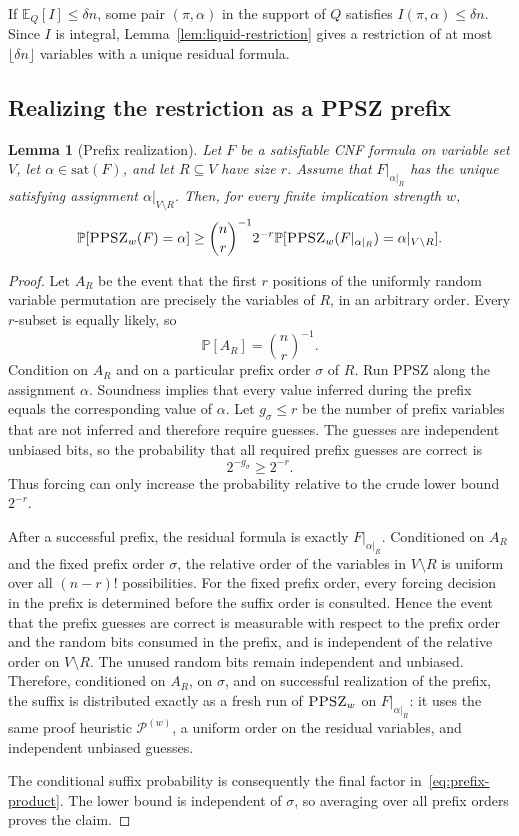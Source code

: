 \documentclass[11pt]{article}
\newtheorem{lemma}[theorem]{Lemma}
\newcommand{\PPSZ}{\textnormal{\textsc{PPSZ}}}
\newcommand{\Pw}{\mathcal P^{(w)}}
\newcommand{\sat}{\mathrm{sat}}
\newcommand{\E}{\mathbb E}
\newcommand{\Prb}{\mathbb P}
\begin{document}
If $\E_Q[I]\le\delta n$, some pair $(\pi,\alpha)$ in the support of $Q$ satisfies $I(\pi,\alpha)\le\delta n$.  Since $I$ is integral, Lemma~\ref{lem:liquid-restriction} gives a restriction of at most $\lfloor\delta n\rfloor$ variables with a unique residual formula.

\subsection{Realizing the restriction as a PPSZ prefix}

\begin{lemma}[Prefix realization]\label{lem:prefix-realization}
Let $F$ be a satisfiable CNF formula on variable set $V$, let $\alpha\in\sat(F)$, and let $R\subseteq V$ have size $r$.  Assume that
$F|_{\alpha|_R}$ has the unique satisfying assignment $\alpha|_{V\setminus R}$.  Then, for every finite implication strength $w$,
\begin{equation}\label{eq:prefix-product}
 \Prb[\PPSZ_w(F)=\alpha]
 \ge
 \binom nr^{-1}2^{-r}
 \Prb[\PPSZ_w(F|_{\alpha|_R})=\alpha|_{V\setminus R}].
\end{equation}
\end{lemma}

\begin{proof}
Let $A_R$ be the event that the first $r$ positions of the uniformly random variable permutation are precisely the variables of $R$, in an arbitrary order.  Every $r$-subset is equally likely, so
\[
 \Prb[A_R]=\binom nr^{-1}.
\]
Condition on $A_R$ and on a particular prefix order $\sigma$ of $R$.  Run PPSZ along the assignment $\alpha$.  Soundness implies that every value inferred during the prefix equals the corresponding value of $\alpha$.  Let $g_\sigma\le r$ be the number of prefix variables that are not inferred and therefore require guesses.  The guesses are independent unbiased bits, so the probability that all required prefix guesses are correct is
\[
 2^{-g_\sigma}\ge2^{-r}.
\]
Thus forcing can only increase the probability relative to the crude lower bound $2^{-r}$.

After a successful prefix, the residual formula is exactly $F|_{\alpha|_R}$.  Conditioned on $A_R$ and the fixed prefix order $\sigma$, the relative order of the variables in $V\setminus R$ is uniform over all $(n-r)!$ possibilities.  For the fixed prefix order, every forcing decision in the prefix is determined before the suffix order is consulted.  Hence the event that the prefix guesses are correct is measurable with respect to the prefix order and the random bits consumed in the prefix, and is independent of the relative order on $V\setminus R$.  The unused random bits remain independent and unbiased.  Therefore, conditioned on $A_R$, on $\sigma$, and on successful realization of the prefix, the suffix is distributed exactly as a fresh run of $\PPSZ_w$ on $F|_{\alpha|_R}$: it uses the same proof heuristic $\Pw$, a uniform order on the residual variables, and independent unbiased guesses.

The conditional suffix probability is consequently the final factor in~\eqref{eq:prefix-product}.  The lower bound is independent of $\sigma$, so averaging over all prefix orders proves the claim.
\end{proof}
\end{document}
